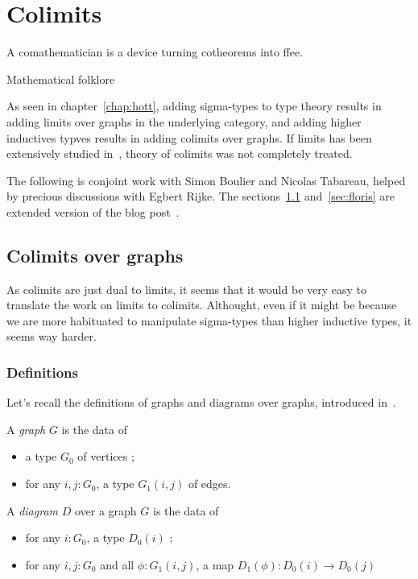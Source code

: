 
\chapter{Colimits}
\label{chap:colim}

\epigraph{A comathematician is a device turning cotheorems into
  ffee.}{Mathematical folklore}

As seen in chapter~\ref{chap:hott}, adding sigma-types to type theory
results in adding limits over graphs in the underlying category, and
adding higher inductives typves results in adding colimits over
graphs. If limits has been extensively studied in~\cite{lumsdaine},
theory of colimits was not completely treated.

The following is conjoint work with Simon Boulier and Nicolas
Tabareau, helped by precious discussions with Egbert Rijke.
The sections~\ref{sec:colim} and~\ref{sec:floris} are extended version
of the blog post~\cite{boulier}.

\section{Colimits over graphs}
\label{sec:colim}

As colimits are just dual to limits, it seems that it would be very
easy to translate the work on limits to colimits. Althought, even if
it might be because we are more habituated to manipulate sigma-types
than higher inductive types, it seems way harder.

\subsection{Definitions}
\label{ssec:colim:defi}

Let's recall the definitions of graphs and diagrams over graphs,
introduced in~\cite{lumsdaine}.

\begin{defi}[Graph]\label{defi:graph}
  A {\em graph} $G$ is the data of
  \begin{itemize}
  \item a type $G_0$ of vertices ;
  \item for any $i,j:G_0$, a type $G_1(i,j)$ of edges.
  \end{itemize}
\end{defi}

\begin{defi}[Diagram]\label{defi:diagram}
  A {\em diagram} $D$ over a graph $G$ is the data of
  \begin{itemize}
  \item for any $i:G_0$, a type $D_0(i)$ ;
  \item for any $i,j:G_0$ and all $\phi : G_1(i,j)$, a map $D_1(\phi)
    : D_0(i) \to D_0(j)$
  \end{itemize}
\end{defi}

